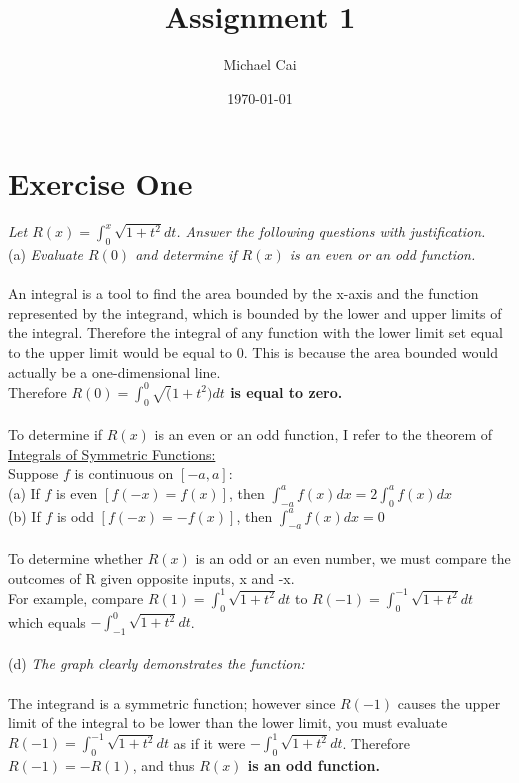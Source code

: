 \documentclass[12pt]{article}
\begin{document}
\title{Assignment 1}
\date{\today}
\author{Michael Cai}

\maketitle{}

\section{Exercise One}

\textit{Let $R(x) = \int_{0}^{x}\sqrt{1+t^2}dt$. Answer the following questions with justification.}\\

(a) \textit{Evaluate $R(0)$ and determine if $R(x)$ is an even or an odd function.}\\
\\An integral is a tool to find the area bounded by the x-axis and the function represented by the integrand, which is bounded by the lower and upper limits of the integral. Therefore the integral of any function with the lower limit set equal to the upper limit would be equal to 0. This is because the area bounded would actually be a one-dimensional line. \\

Therefore \textbf{$R(0) = \int_{0}^{0} \sqrt(1+t^2) dt$ is equal to zero.} \\
\\
To determine if $R(x)$ is an even or an odd function, I refer to the theorem of \underline{Integrals of Symmetric Functions:}
\\
Suppose $f$ is continuous on $[-a,a]$: \\
(a) If $f$ is even $[f(-x) = f(x)]$, then $\int_{-a}^{a}f(x)dx = 2\int_{0}^{a}f(x)dx$ \\
(b) If $f$ is odd $[f(-x) = -f(x)]$, then $\int_{-a}^{a}f(x)dx = 0$ \\
\\
To determine whether $R(x)$ is an odd or an even number, we must compare the outcomes of R given opposite inputs, x and -x. \\
For example, compare $R(1) = \int_{0}^{1} \sqrt{1+t^2}dt$ to $R(-1) = \int_{0}^{-1} \sqrt{1+t^2}dt$ which equals $-\int_{-1}^{0} \sqrt{1+t^2}dt$. \\
\\
(d) \textit{The graph clearly demonstrates the function:}\\
\\
The integrand is a symmetric function; however since $R(-1)$ causes the upper limit of the integral to be lower than the lower limit, you must evaluate $R(-1) = \int_{0}^{-1} \sqrt{1+t^2} dt $ as if it were $-\int_{0}^{1}\sqrt{1+t^2}dt$. Therefore $R(-1) = -R(1)$, and thus \textbf{$R(x)$ is an odd function.}
\\
\end{document}
